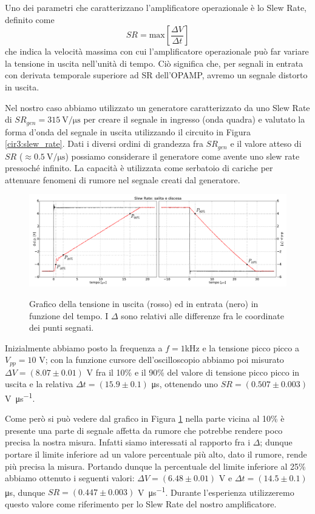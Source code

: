 Uno dei parametri che caratterizzano l'amplificatore operazionale è lo Slew Rate, definito come
$$SR = \mathrm{max}\left[\frac{\Delta V}{\Delta t}\right]$$
che indica la velocità massima con cui l'amplificatore operazionale può far variare la tensione in uscita nell'unità di tempo. Ciò significa che, per segnali in entrata con derivata temporale superiore ad SR dell'OPAMP, avremo un segnale distorto in uscita.

Nel nostro caso abbiamo utilizzato un generatore caratterizzato da uno Slew Rate di $SR_{gen}=\SI{315}{\volt\per\micro\second}$ per creare il segnale in ingresso (onda quadra) e valutato la forma d'onda del segnale in uscita utilizzando il circuito in Figura \ref{cir3:slew_rate}.
Dati i diversi ordini di grandezza fra $SR_{gen}$ e il valore atteso di $SR$ ($\approx \SI{0.5}{\volt\per\micro\second} $) possiamo considerare il generatore come avente uno slew rate pressoché infinito.
La capacità è utilizzata come serbatoio di cariche per attenuare fenomeni di rumore nel segnale creati dal generatore.

\begin{figure}[ht]
 \centering
   {\includegraphics[width=\textwidth]{../E03/latex/sr_uad.pdf}}
 \caption{Grafico della tensione in uscita (rosso) ed in entrata (nero) in funzione del tempo. I $\Delta$ sono relativi alle differenze fra le coordinate dei punti segnati.}
 \label{gr3:slew_rate}
\end{figure}

Inizialmente abbiamo posto la frequenza a $f=1$\si{\kilo\hertz} e la tensione picco picco a $V_{pp}=10$ \si{\volt}; con la funzione cursore dell'oscilloscopio abbiamo poi misurato $\Delta V = (8.07 \pm 0.01)$ \si{\volt} fra il 10\% e il 90\% del valore di tensione picco picco in uscita e la relativa $\Delta t = (15.9 \pm 0.1)$ \si{\micro\second}, ottenendo uno $SR=(0.507 \pm 0.003)$ \si{\volt\per\micro\second}.

Come però si può vedere dal grafico in Figura \ref{gr3:slew_rate} nella parte vicina al 10\% è presente una parte di segnale affetta da rumore che potrebbe rendere poco precisa la nostra misura. Infatti siamo interessati al rapporto fra i $\Delta$; dunque portare il limite inferiore ad un valore percentuale più alto, dato il rumore, rende più precisa la misura. Portando dunque la percentuale del limite inferiore al 25\% abbiamo ottenuto i seguenti valori: $\Delta V = (6.48 \pm 0.01)$ \si{\volt} e $\Delta t = (14.5 \pm 0.1)$ \si{\micro\second}, dunque $SR = (0.447 \pm 0.003)$ \si{\volt\per\micro\second}. Durante l'esperienza utilizzeremo questo valore come riferimento per lo Slew Rate del nostro amplificatore.

